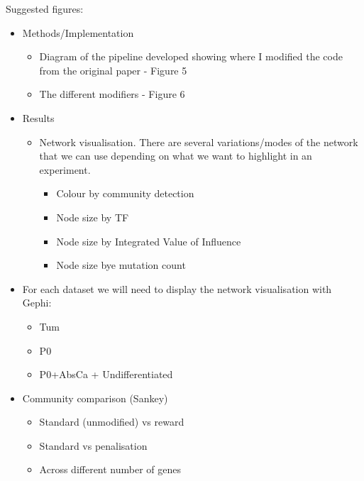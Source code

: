 Suggested figures:
\begin{itemize}
    \item Methods/Implementation
          \begin{itemize}
              \item Diagram of the pipeline developed showing where I modified the code from the original paper  - Figure 5
              \item The different modifiers - Figure 6
          \end{itemize}
    \item Results
          \begin{itemize}
              \item Network visualisation. There are several variations/modes of the network that we can use depending on what we want to highlight in an experiment.
                    \begin{itemize}
                        \item Colour by community detection
                        \item Node size by TF
                        \item Node size by Integrated Value of Influence
                        \item Node size bye mutation count
                    \end{itemize}

          \end{itemize}
\end{itemize}
\begin{itemize}
    \item For each dataset we will need to display the network visualisation with Gephi:
          \begin{itemize}
              \item Tum
              \item P0
              \item P0+AbsCa  + Undifferentiated
          \end{itemize}
\end{itemize}

\begin{itemize}
    \item Community comparison (Sankey)
          \begin{itemize}
              \item Standard (unmodified) vs reward
              \item Standard vs penalisation
              \item Across different number of genes
          \end{itemize}
\end{itemize}

